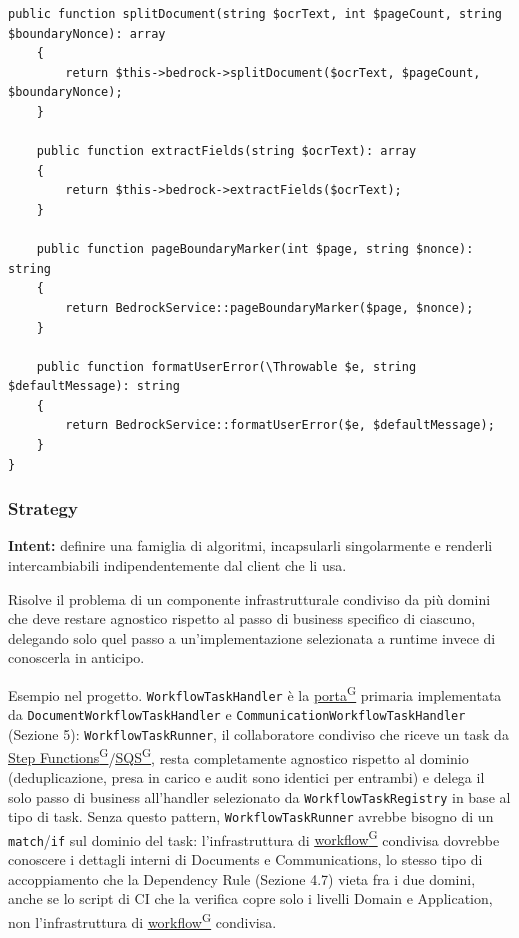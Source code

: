 \documentclass[a4paper,12pt]{article}
\providecommand{\glslink}[2]{\href{https://alittlebyte-19.github.io/Documentazione/glossario.html\#gls-#1}{\underline{#2}\textsuperscript{\scriptsize G}}}
\begin{document}
\begin{sloppypar}
\begin{lstlisting}[style=phplisting, caption={BedrockDocumentAiAdapter: adapter secondario sopra BedrockService}]
    public function splitDocument(string $ocrText, int $pageCount, string $boundaryNonce): array
    {
        return $this->bedrock->splitDocument($ocrText, $pageCount, $boundaryNonce);
    }

    public function extractFields(string $ocrText): array
    {
        return $this->bedrock->extractFields($ocrText);
    }

    public function pageBoundaryMarker(int $page, string $nonce): string
    {
        return BedrockService::pageBoundaryMarker($page, $nonce);
    }

    public function formatUserError(\Throwable $e, string $defaultMessage): string
    {
        return BedrockService::formatUserError($e, $defaultMessage);
    }
}
\end{lstlisting}

\subsubsection{Strategy}

\textbf{Intent:} definire una famiglia di algoritmi, incapsularli singolarmente e renderli intercambiabili indipendentemente dal client che li usa.

Risolve il problema di un componente infrastrutturale condiviso da più domini che deve restare agnostico rispetto al passo di business specifico di ciascuno, delegando solo quel passo a un'implementazione selezionata a runtime invece di conoscerla in anticipo.

Esempio nel progetto. \texttt{WorkflowTaskHandler} è la \glslink{porta}{porta} primaria implementata da \texttt{DocumentWorkflowTaskHandler} e \texttt{CommunicationWorkflowTaskHandler} (Sezione 5): \texttt{WorkflowTaskRunner}, il collaboratore condiviso che riceve un task da \glslink{step-functions}{Step Functions}/\glslink{sqs-simple-queue-service}{SQS}, resta completamente agnostico rispetto al dominio (deduplicazione, presa in carico e audit sono identici per entrambi) e delega il solo passo di business all'handler selezionato da \texttt{WorkflowTaskRegistry} in base al tipo di task. Senza questo pattern, \texttt{WorkflowTaskRunner} avrebbe bisogno di un \texttt{match}/\texttt{if} sul dominio del task: l'infrastruttura di \glslink{workflow}{workflow} condivisa dovrebbe conoscere i dettagli interni di Documents e Communications, lo stesso tipo di accoppiamento che la Dependency Rule (Sezione 4.7) vieta fra i due domini, anche se lo script di CI che la verifica copre solo i livelli Domain e Application, non l'infrastruttura di \glslink{workflow}{workflow} condivisa.


\end{sloppypar}
\end{document}
